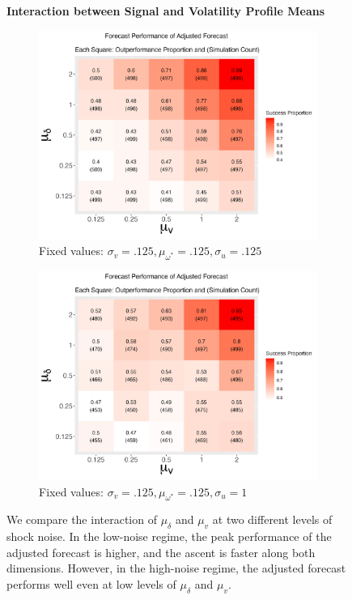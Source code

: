 \documentclass[11pt,3p,review,authoryear]{elsarticle}
\theoremstyle{definition}
\begin{document}
  \begin{figure}[!h]
    \centering
    \textbf{Interaction between Signal and Volatility Profile Means}\par\medskip
  \begin{subfigure}{.44\linewidth} 
    \centering
      \includegraphics[scale = .42]{simulation_plots/Aug28_224330_2024_mu[delta]_mu[v].png}
      \caption{Fixed values: $\sigma_{v} = .125, \mu_{\omega^{*}} = .125, \sigma_{u} = .125$}\label{fig:sim_4}
  \end{subfigure}\hspace{12mm} %
  \begin{subfigure}{.44\linewidth} 
    \centering
      \includegraphics[scale=.42]{simulation_plots/Aug28_224337_2024_mu[delta]_mu[v].png}
      \caption{Fixed values: $\sigma_{v} = .125, \mu_{\omega^{*}} = .125, \sigma_{u} = 1$}\label{fig:sim_5}
  \end{subfigure}
  
      \caption{We compare the interaction of $\mu_{\delta}$ and $\mu_{v}$ at two different levels of shock noise.  In the low-noise regime, the peak performance of the adjusted forecast is higher, and the ascent is faster along both dimensions.   However, in the high-noise regime, the adjusted forecast performs well even at low levels of $\mu_{\delta}$ and $\mu_{v}$.}
      \label{fig:sig_volprof}
    \end{figure}
\end{document}
